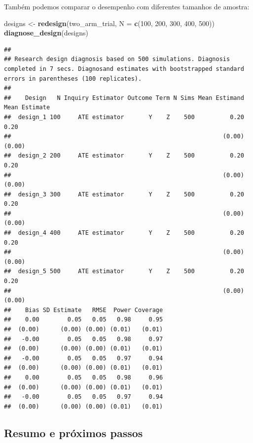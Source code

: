 \documentclass[
]{article}
\newenvironment{Shaded}{\begin{snugshade}}{\end{snugshade}}
\newcommand{\AttributeTok}[1]{\textcolor[rgb]{0.13,0.29,0.53}{#1}}
\newcommand{\DecValTok}[1]{\textcolor[rgb]{0.00,0.00,0.81}{#1}}
\newcommand{\FunctionTok}[1]{\textcolor[rgb]{0.13,0.29,0.53}{\textbf{#1}}}
\newcommand{\NormalTok}[1]{#1}
\newcommand{\OtherTok}[1]{\textcolor[rgb]{0.56,0.35,0.01}{#1}}
\begin{document}
Também podemos comparar o desempenho com diferentes tamanhos de amostra:

\begin{Shaded}
\begin{Highlighting}[]
\NormalTok{designs }\OtherTok{\textless{}{-}} \FunctionTok{redesign}\NormalTok{(two\_arm\_trial, }\AttributeTok{N =} \FunctionTok{c}\NormalTok{(}\DecValTok{100}\NormalTok{, }\DecValTok{200}\NormalTok{, }\DecValTok{300}\NormalTok{, }\DecValTok{400}\NormalTok{, }\DecValTok{500}\NormalTok{))}
\FunctionTok{diagnose\_design}\NormalTok{(designs)}
\end{Highlighting}
\end{Shaded}

\begin{verbatim}
## 
## Research design diagnosis based on 500 simulations. Diagnosis completed in 7 secs. Diagnosand estimates with bootstrapped standard errors in parentheses (100 replicates).
## 
##    Design   N Inquiry Estimator Outcome Term N Sims Mean Estimand Mean Estimate
##  design_1 100     ATE estimator       Y    Z    500          0.20          0.20
##                                                            (0.00)        (0.00)
##  design_2 200     ATE estimator       Y    Z    500          0.20          0.20
##                                                            (0.00)        (0.00)
##  design_3 300     ATE estimator       Y    Z    500          0.20          0.20
##                                                            (0.00)        (0.00)
##  design_4 400     ATE estimator       Y    Z    500          0.20          0.20
##                                                            (0.00)        (0.00)
##  design_5 500     ATE estimator       Y    Z    500          0.20          0.20
##                                                            (0.00)        (0.00)
##    Bias SD Estimate   RMSE  Power Coverage
##    0.00        0.05   0.05   0.98     0.95
##  (0.00)      (0.00) (0.00) (0.01)   (0.01)
##   -0.00        0.05   0.05   0.98     0.97
##  (0.00)      (0.00) (0.00) (0.01)   (0.01)
##   -0.00        0.05   0.05   0.97     0.94
##  (0.00)      (0.00) (0.00) (0.01)   (0.01)
##    0.00        0.05   0.05   0.98     0.96
##  (0.00)      (0.00) (0.00) (0.01)   (0.01)
##   -0.00        0.05   0.05   0.97     0.94
##  (0.00)      (0.00) (0.00) (0.01)   (0.01)
\end{verbatim}

\subsection{Resumo e próximos passos}\label{resumo-e-pruxf3ximos-passos-3}
\end{document}
